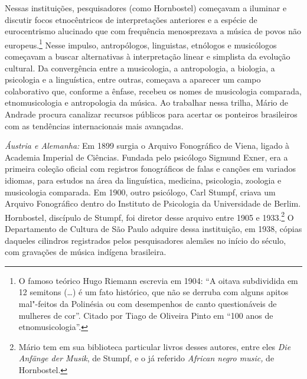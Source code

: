 Nessas instituições, pesquisadores (como Hornbostel) começavam a
iluminar e discutir focos etnocêntricos de interpretações anteriores e a
espécie de eurocentrismo alucinado que com frequência menosprezava a
música de povos não europeus.\footnote{O famoso teórico Hugo Riemann
  escrevia em 1904: ``A oitava subdividida em 12 semitons (\ldots{}) é um
  fato histórico, que não se derruba com alguns apitos mal"-feitos da
  Polinésia ou com desempenhos de canto questionáveis de mulheres de
  cor''. Citado por Tiago de Oliveira Pinto em ``100 anos de
  etnomusicologia''.} Nesse impulso, antropólogos, linguistas, etnólogos
e musicólogos começavam a buscar alternativas à interpretação linear e
simplista da evolução cultural. Da convergência entre a musicologia, a
antropologia, a biologia, a psicologia e a linguística, entre outras,
começava a aparecer um campo colaborativo que,
conforme a ênfase, recebeu os nomes de musicologia comparada,
etnomusicologia e antropologia da música. Ao trabalhar nessa trilha,
Mário de Andrade procura canalizar recursos públicos para acertar os
ponteiros brasileiros com as tendências internacionais mais avançadas.

\emph{Áustria e Alemanha:} Em 1899 surgia o Arquivo Fonográfico de
Viena, ligado à Academia Imperial de Ciências. Fundada pelo psicólogo
Sigmund Exner, era a primeira coleção oficial com registros fonográficos
de falas e canções em variados idiomas, para estudos na área da
linguística, medicina, psicologia, zoologia e musicologia comparada. Em
1900, outro psicólogo, Carl Stumpf, criava um Arquivo Fonográfico dentro
do Instituto de Psicologia da Universidade de Berlim. Hornbostel,
discípulo de Stumpf, foi diretor desse arquivo entre 1905 e
1933.\footnote{Mário tem em sua biblioteca particular livros desses
  autores, entre eles \emph{Die Anfänge der Musik}, de Stumpf, e o já
  referido \emph{African negro music,} de Hornbostel.} O Departamento de
Cultura de São Paulo adquire dessa instituição, em 1938, cópias daqueles
cilindros registrados pelos pesquisadores alemães no início do século,
com gravações de música indígena brasileira.

